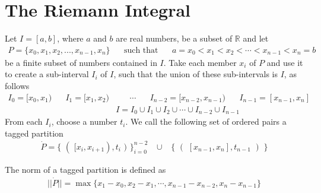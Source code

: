 \section{The Riemann Integral}

\begin{definition}
Let $I = [a, b]$, where $a$ and $b$ are real numbers, be a subset of $\mathbb{R}$ and let 
\begin{align*}
    P = \{x_{0}, x_{1}, x_{2}, ..., x_{n-1}, x_{n}\} \hspace{20pt} \text{such that} \hspace{20pt} a = x_{0} < x_{1} < x_{2} < \cdots < x_{n-1} < x_{n} = b
\end{align*}
be a finite subset of numbers contained in $I$. Take each member $x_{i}$ of $P$ and use it to create a sub-interval $I_{i}$ of $I$, such that the union of these sub-intervals is $I$, as follows
\begin{align*}
    I_{0} = [x_{0}, x_{1}) \hspace{20pt} I_{1} = [x_{1}, x_{2})& \hspace{20pt} \cdots \hspace{20pt} I_{n-2} = [x_{n-2}, x_{n-1}) \hspace{20pt} I_{n-1} = [x_{n-1}, x_{n}]\\[2ex]
    &I = I_{0} \cup I_{1} \cup I_{2} \cup \cdots \cup I_{n-2} \cup I_{n-1}
\end{align*}
From each $I_{i}$, choose a number $t_{i}$. We call the following set of ordered pairs a tagged partition
\begin{align*}
    \dot P = \{ \hspace{4pt} ( \hspace{4pt} [x_{i}, x_{i+1}), t_{i} \hspace{4pt} ) \hspace{4pt}\}_{i = 0}^{n-2} \hspace{10pt} \cup \hspace{10pt} \{ \hspace{4pt} ( \hspace{4pt} [x_{n-1}, x_{n}], t_{n-1} \hspace{4pt} ) \hspace{4pt} \}
\end{align*}
\end{definition}

\begin{definition}
The norm of a tagged partition is defined as
\begin{align*}
    \lvert \lvert \dot P \rvert \rvert = \max \{x_{1} - x_{0}, x_{2} - x_{1}, \cdots , x_{n-1} - x_{n-2}, x_{n} - x_{n-1}\}
\end{align*}
\end{definition}


